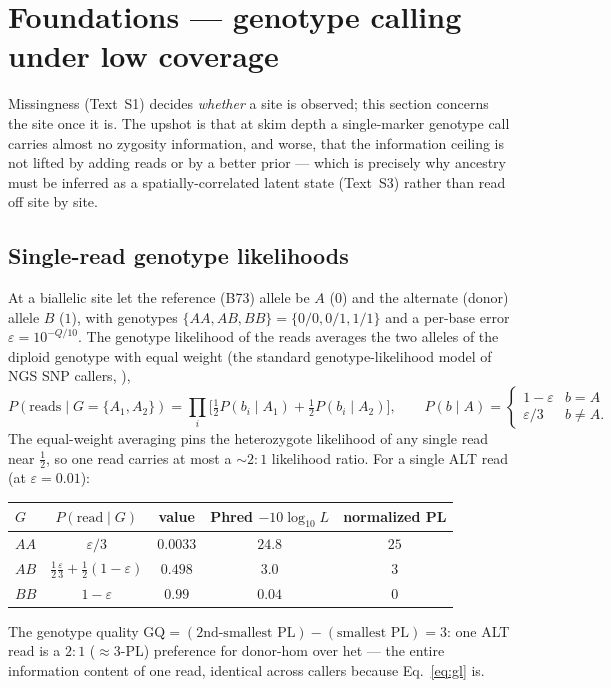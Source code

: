 \documentclass[11pt]{article}
\begin{document}
\section{Foundations --- genotype calling under low coverage}
\label{sec:foundations-calling}

Missingness (Text~S1) decides \emph{whether} a site is observed; this section
concerns the site once it is. The upshot is that at skim depth a single-marker
genotype call carries almost no zygosity information, and worse, that the
information ceiling is not lifted by adding reads or by a better prior --- which is
precisely why ancestry must be inferred as a spatially-correlated latent state
(Text~S3) rather than read off site by site.

\subsection{Single-read genotype likelihoods}
\label{sec:gl}

At a biallelic site let the reference (B73) allele be $A$ ($0$) and the alternate
(donor) allele $B$ ($1$), with genotypes $\{AA, AB, BB\}=\{0/0,0/1,1/1\}$ and a
per-base error $\varepsilon = 10^{-Q/10}$. The genotype likelihood of the reads
averages the two alleles of the diploid genotype with equal weight (the standard
genotype-likelihood model of NGS SNP callers, \citealp{depristo_2011,nielsen_2011}),
\begin{equation}
P(\text{reads}\mid G=\{A_1,A_2\})
= \prod_{i}\Big[\tfrac12 P(b_i\mid A_1) + \tfrac12 P(b_i\mid A_2)\Big],
\qquad
P(b\mid A)=
\begin{cases}
1-\varepsilon & b=A\\
\varepsilon/3 & b\ne A .
\end{cases}
\label{eq:gl}
\end{equation}
The equal-weight averaging pins the heterozygote likelihood of any single read
near $\tfrac12$, so one read carries at most a ${\sim}2{:}1$ likelihood ratio.
For a single ALT read (at $\varepsilon=0.01$):
\begin{center}
\begin{tabular}{l c c c c}
\toprule
$G$ & $P(\text{read}\mid G)$ & value & Phred $-10\log_{10}L$ & normalized PL \\
\midrule
$AA$ & $\varepsilon/3$                               & $0.0033$ & $24.8$ & $25$ \\
$AB$ & $\tfrac12\tfrac{\varepsilon}{3}+\tfrac12(1-\varepsilon)$ & $0.498$  & $3.0$  & $3$ \\
$BB$ & $1-\varepsilon$                               & $0.99$   & $0.04$ & $0$ \\
\bottomrule
\end{tabular}
\end{center}
The genotype quality $\mathrm{GQ}=(\text{2nd-smallest PL})-(\text{smallest PL})=3$:
one ALT read is a $2{:}1$ ($\approx 3$-PL) preference for donor-hom over het --- the
entire information content of one read, identical across callers because
Eq.~\eqref{eq:gl} is.
\end{document}
